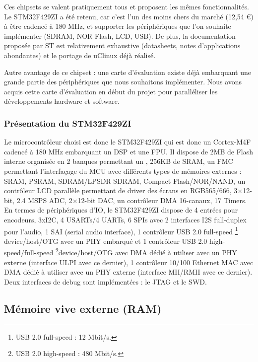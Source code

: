 Ces chipsets se valent pratiquement tous et proposent les mêmes fonctionnalités.
Le STM32F429ZI a été retenu, car c'est l'un des moins chers du marché (12,54 €) à être cadencé à 180 MHz, et supporter les périphériques que l'on souhaite implémenter (SDRAM, NOR Flash, LCD, USB). 
De plus, la documentation proposée par ST est relativement exhaustive (datasheets, notes d'applications abondantes) et le portage de uClinux déjà réalisé.
            
Autre avantage de ce chipset : une carte d'évaluation existe déjà embarquant une grande partie des périphériques que nous souhaitons implémenter. 
Nous avons acquis cette carte d'évaluation en début du projet pour paralléliser les développements hardware et software.
            
\subsubsection{Présentation du STM32F429ZI}
Le microcontrôleur choisi est donc le STM32F429ZI qui est donc un Cortex-M4F cadencé à 180 MHz embarquant un \gls{DSP} et une \gls{FPU}.
Il dispose de 2MB de Flash interne organisée en 2 banques permettant un , 256KB de SRAM, un \gls{FMC} permettant l'interfaçage du MCU avec différents types de mémoires externes : SRAM, PSRAM, SDRAM/LPSDR SDRAM, Compact Flash/NOR/NAND, un contrôleur LCD parallèle permettant de driver des écrans en RGB565/666, 3×12-bit, 2.4 MSPS ADC, 2×12-bit DAC, un contrôleur DMA 16-canaux, 17 Timers. \\
En termes de périphériques d'IO, le STM32F429ZI dispose de 4 entrées pour encodeurs, 3xI2C, 4 USARTs/4 UARTs, 6 SPIs avec 2 interfaces I2S full-duplex pour l'audio, 1 SAI (serial audio interface), 1 contrôleur USB 2.0 full-speed \footnote{USB 2.0 full-speed : 12 Mbit/s.}  device/host/OTG avec un PHY embarqué et 1 contrôleur USB 2.0 high-speed/full-speed \footnote{USB 2.0 high-speed : 480 Mbit/s.}device/host/OTG avec DMA dédié à utiliser avec un \gls{PHY} externe (interface \gls{ULPI} avec ce dernier), 1 contrôleur 10/100 Ethernet MAC avec DMA dédié à utiliser avec un \gls{PHY} externe (interface \gls{MII/RMII} avec ce dernier).\\
Deux interfaces de debug sont implémentées : le \gls{JTAG} et le \gls{SWD}.
      
\subsection{Mémoire vive externe (RAM)}
